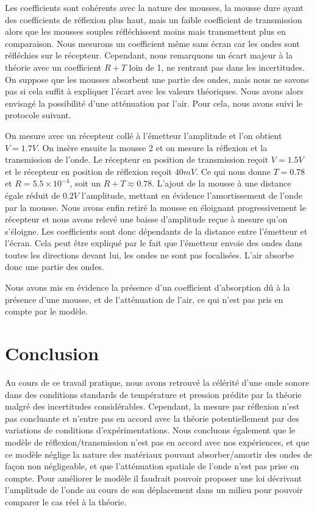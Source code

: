 \documentclass[12pt]{article}
\begin{document}
Les coefficients sont cohérents avec la nature des mousses, la mousse dure ayant des coefficients de réflexion plus haut, mais un faible coefficient de transmission
alors que les mousses souples réfléchissent moins mais transmettent plus en comparaison. Nous mesurons un coefficient même sans écran car les ondes sont réfléchies sur le récepteur. 
 Cependant, nous remarquons un écart majeur à la théorie avec un coefficient $R+T$ loin de 1, ne rentrant pas dans les incertitudes.
On suppose que les mousses absorbent une partie des ondes, mais nous ne savons pas si cela suffit à expliquer l'écart avec les valeurs théoriques.
Nous avons alors envisagé la possibilité d'une atténuation par l'air. Pour cela, nous avons suivi le protocole suivant. 

On mesure avec un récepteur collé à l'émetteur l'amplitude et l'on obtient $V = 1.7V$. On insère ensuite la mousse 2 et on mesure la réflexion et la transmission de l'onde.
Le récepteur en position de transmission reçoit $V=1.5V$ et le récepteur en position de réflexion reçoit $40mV$. Ce qui nous donne $T=0.78$ et $R=5.5\times 10^{-4}$, soit un $R+T \approx 0.78$. 
L'ajout de la mousse à une distance égale réduit de $0.2V$ l'amplitude, mettant en évidence l'amortissement de l'onde par la mousse. Nous avons enfin retiré la mousse en éloignant progressivement le récepteur et nous avons
relevé une baisse d'amplitude reçue à mesure qu'on s'éloigne. Les coefficients sont donc dépendants de la distance entre l'émetteur et l'écran. Cela peut être expliqué par le fait que l'émetteur envoie des ondes dans toutes les directions devant lui, les ondes ne sont pas focalisées. L'air absorbe donc une partie des ondes. 

Nous avons mis en évidence la présence d'un coefficient d'absorption dû à la présence
d'une mousse, et de l'atténuation de l'air, ce qui n'est pas pris en compte par le modèle.

\section{Conclusion}
Au cours de ce travail pratique, nous avons retrouvé la célérité d'une onde sonore dans des conditions standards de température et pression prédite par la théorie malgré des incertitudes considérables.
Cependant, la mesure par réflexion n'est pas concluante et n'entre pas en accord avec la théorie potentiellement par des variations de conditions d'expérimentations. Nous concluons également
que le modèle de réflexion/transmission n'est pas en accord avec nos expériences, et que ce modèle néglige la nature des matériaux pouvant absorber/amortir des ondes de façon non négligeable, et que l'atténuation
spatiale de l'onde n'est pas prise en compte. Pour améliorer le modèle il faudrait pouvoir proposer une loi décrivant l'amplitude de l'onde au cours de son déplacement dans un milieu pour pouvoir comparer le cas réel à la théorie.
\end{document}
